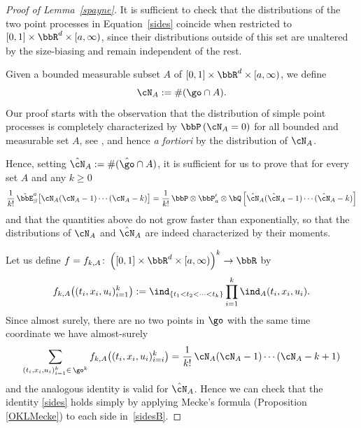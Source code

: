 \begin{proof}[Proof of Lemma~\ref{spayne}]
It is sufficient to check that the distributions of the two point processes in Equation~\eqref{sides} coincide when restricted to
$[0,1]\times \bbR^d\times [a,\infty)$, since their distributions outside of this set are unaltered by the size-biasing and remain independent of the rest.

Given a bounded measurable subset $A$ of $[0,1]\times \bbR^d\times [a,\infty)$, we define
\begin{equation}
\cN_A:= \#(\go \cap A).
\end{equation}
Our proof starts with the observation that the distribution of simple point processes is completely characterized by
$\bbP \left(\cN_A=0 \right)$ for all bounded and measurable set $A$, see \cite[Th.\,6.11]{PoiBook}, and hence \textit{a fortiori} by the distribution of $\cN_A$.

Hence, setting $\hat \cN_A:= \#(\hat\go \cap A)$, it is sufficient for us to prove that for every set $A$ and any $k \geq 0$
\begin{equation}
\label{sidesB}
\frac{1}{k!}\,\tilde \bbE^a_{\beta} \bigl[ \cN_A(\cN_A-1)\cdots (\cN_A-k) \bigr]= \frac{1}{k!}\,\bbP\otimes \bbP'_a \otimes \bQ\left[ \hat \cN_A(\hat\cN_A-1)\cdots (\hat \cN_A-k) \right]
\end{equation}
and that the quantities above do not grow faster than exponentially, so that the distributions of $\cN_A$ and $\hat \cN_A$ are indeed characterized by their moments.

Let us define $f=f_{k,A} \colon \left([0,1]\times \bbR^d\times [a,\infty)\right)^k \to \bbR$ by
\[
f_{k,A} \bigl((t_i,x_i,u_i)_{i=1}^k \bigr):= \ind_{\{t_1< t_2 < \dots < t_k\}} \prod_{i=1}^k \ind_{A}(t_i,x_i,u_i).
\]
Since almost surely, there are no two points in $\go$ with the same time coordinate we have almost-surely
\begin{equation}
\sum_{(t_i,x_i,u_i)_{i=1}^k\in \, \go^k} f_{k,A}\bigl((t_i,x_i,u_i)_{i=i}^k \bigr) = \frac{1}{k!}\, \cN_A(\cN_A-1)\cdots (\cN_A-k +1)
\end{equation}
and the analogous identity is valid for $\hat \cN_A$.
Hence we can check that the identity \eqref{sides} holds simply by applying Mecke's formula (Proposition \ref{OKLMecke}) to each side in~\eqref{sidesB}.


\end{proof}
